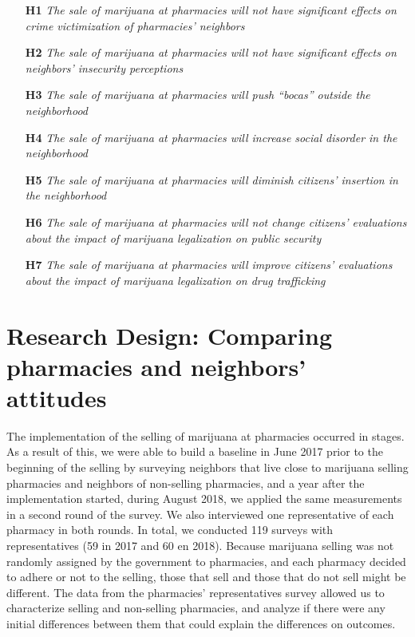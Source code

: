 \documentclass[11pt]{article}
\begin{document}
\begin{itemize}
\item [\textbf{H1}] \textit{The sale of marijuana at pharmacies will not have significant effects on crime victimization of pharmacies' neighbors}

\item [\textbf{H2}] \textit{The sale of marijuana at pharmacies will not have significant effects on neighbors' insecurity perceptions}

\item [\textbf{H3}] \textit{The sale of marijuana at pharmacies will push ``bocas'' outside the neighborhood}

\item [\textbf{H4}] \textit{The sale of marijuana at pharmacies will increase social disorder in the neighborhood}

\item [\textbf{H5}] \textit{The sale of marijuana at pharmacies will diminish citizens' insertion in the neighborhood}

\item [\textbf{H6}] \textit{The sale of marijuana at pharmacies will not change citizens' evaluations about the impact of marijuana legalization on public security}

\item [\textbf{H7}] \textit{The sale of marijuana at pharmacies will improve citizens' evaluations about the impact of marijuana legalization on drug trafficking}

\end{itemize}

\section{Research Design: Comparing pharmacies and neighbors' attitudes}

The implementation of the selling of marijuana at pharmacies occurred in stages. As a result of this, we were able to build a baseline in June 2017 prior to the beginning of the selling by surveying neighbors that live close to marijuana selling pharmacies and neighbors of non-selling pharmacies, and  a year after the implementation started, during August 2018, we applied the same measurements in a second round of the survey. We also interviewed one representative of each pharmacy in both rounds. In total, we conducted 119 surveys with representatives (59 in 2017 and 60 en 2018). Because marijuana selling was not randomly assigned by the government to pharmacies, and each pharmacy decided to adhere or not to the selling, those that sell and those that do not sell might be different. The data from the pharmacies' representatives survey  allowed us to characterize selling and non-selling pharmacies, and analyze if there were any initial differences between them that could explain the differences on outcomes. 
\end{document}
